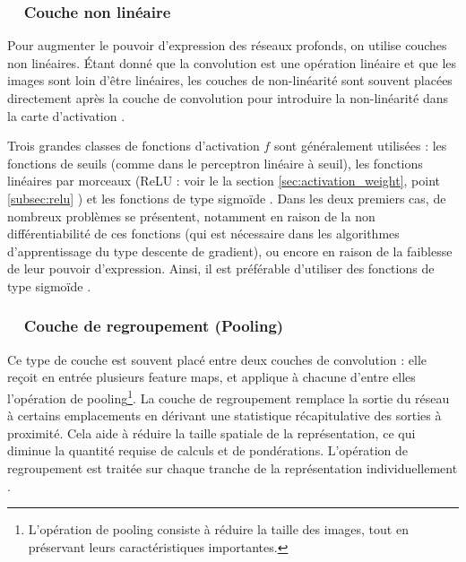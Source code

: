	
	\subsubsection*{\qquad \textbullet \ \ Couche non linéaire}
	
	Pour augmenter le pouvoir d'expression des réseaux profonds, on utilise couches non linéaires\cite{antoine2018apprentissage}.
	Étant donné que la convolution est une opération linéaire et que les images sont loin d'être linéaires, les couches de non-linéarité sont souvent placées directement après la couche de convolution pour introduire la non-linéarité dans la carte d'activation \cite{goodfellow2016deep}.
	
	Trois grandes classes de fonctions d'activation $f$ sont généralement utilisées : les fonctions de seuils (comme dans le perceptron linéaire à seuil), les fonctions linéaires par morceaux (ReLU : voir le la section \ref{sec:activation_weight}, point \ref{subsec:relu} ) et les fonctions de type sigmoïde \cite{goodfellow2016deep}. Dans les deux premiers cas, de nombreux problèmes se présentent, notamment en raison de la non différentiabilité de ces fonctions (qui est nécessaire dans les algorithmes d'apprentissage du type descente de gradient), ou encore en raison de la faiblesse de leur pouvoir d'expression. Ainsi, il est préférable d'utiliser des fonctions de type sigmoïde \cite{antoine2018apprentissage}.
	
	
	\subsubsection*{\qquad \textbullet \ \ Couche de regroupement (Pooling)}
	Ce type de couche est souvent placé entre deux couches de convolution : elle reçoit en entrée plusieurs feature maps, et applique à chacune d'entre elles l'opération de pooling\footnote{L'opération de pooling consiste à réduire la taille des images, tout en préservant leurs caractéristiques importantes.}. La couche de regroupement remplace la sortie du réseau à certains emplacements en dérivant une statistique récapitulative des sorties à proximité. Cela aide à réduire la taille spatiale de la représentation, ce qui diminue la quantité requise de calculs et de pondérations. L'opération de regroupement est traitée sur chaque tranche de la représentation individuellement \cite{goodfellow2016deep}. 
	
